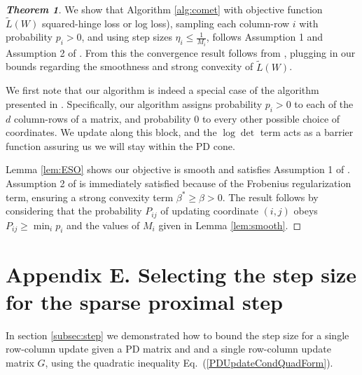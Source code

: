 \documentclass[twoside,11pt]{article}
\newcommand\mat[1]{{#1}}
\newcommand{\W}{\mat{W}}
\newcommand{\Pp}{\mat{P}}
\newcommand{\tL}{\tilde{L}(\W)}
\renewcommand{\eqref}[1]{Eq.~(\ref{#1})}
\begin{document}

\begin{proof}[{\bf{Theorem 1}}]
We show that Algorithm \ref{alg:comet} with objective function $\tL$ squared-hinge loss or log loss), sampling each column-row $i$ with probability $p_i >0$, and using step sizes $\eta_i \leq \frac{1}{M_i}$, follows Assumption 1 and Assumption 2 of \citet{richtarik2013optimal}. From this the convergence result follows from \citeauthor[Theorem 3]{richtarik2013optimal}, plugging in our bounds regarding the smoothness and strong convexity of $\tL$.

We first note that our algorithm is indeed a special case of the algorithm presented in \citet{richtarik2013optimal}. Specifically, our algorithm assigns probability $p_i > 0 $ to each of the $d$ column-rows of a matrix, and probability $0$ to every other possible choice of coordinates. We update along this block, and the $\log \det$ term acts as a barrier function
assuring us we will stay within the PD cone.

Lemma \ref{lem:ESO} shows our objective is smooth and satisfies Assumption 1 of \citeauthor{richtarik2013optimal}. Assumption 2 of \citeauthor{richtarik2013optimal} is immediately satisfied because of the Frobenius regularization term, ensuring a strong convexity term $\beta^* \geq \beta > 0$. The result follows by considering that the probability $\Pp_{ij}$ of updating coordinate $(i,j)$ obeys $\Pp_{ij} \geq \min_i p_i $ and the values of $M_i$ given in Lemma \ref{lem:smooth}.

\end{proof}

\section*{Appendix E. Selecting the step size for the sparse proximal step}
In section \ref{subsec:step} we demonstrated how to bound the step size for a single row-column update given a PD matrix and and a single row-column update matrix $\mat{G}$, using the quadratic inequality \eqref{PDUpdateCondQuadForm}.
\end{document}
